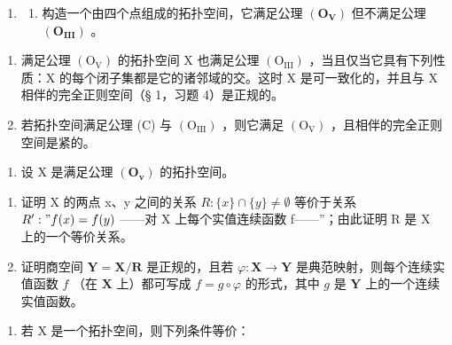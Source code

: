 \ExerciseSection

\begin{enumerate}
\def\labelenumi{\roman{enumi})}
\tightlist
\item
  \begin{enumerate}
  \def\labelenumii{\alph{enumii})}
  \tightlist
  \item
    构造一个由四个点组成的拓扑空间，它满足公理 \((\mathbf{O}_{\mathbf{V}})\) 但不满足公理 \((\mathbf{O}_{\mathbf{III}})\) 。
  \end{enumerate}
\end{enumerate}

\begin{enumerate}
\def\labelenumi{\alph{enumi})}
\setcounter{enumi}{1}
\item
  满足公理 \((\mathrm{O}_{\mathrm{V}})\) 的拓扑空间 X 也满足公理 \((\mathrm{O}_{\mathrm{III}})\) ，当且仅当它具有下列性质：X 的每个闭子集都是它的诸邻域的交。这时 X 是可一致化的，并且与 X 相伴的完全正则空间（§ 1，习题 4）是正规的。
\item
  若拓扑空间满足公理 (C) 与 \((\mathrm{O}_{\mathrm{III}})\) ，则它满足 \((\mathrm{O}_{\mathrm{V}})\) ，且相伴的完全正则空间是紧的。
\end{enumerate}

\begin{enumerate}
\def\labelenumi{\arabic{enumi})}
\setcounter{enumi}{1}
\tightlist
\item
  设 X 是满足公理 \((\mathbf{O}_{\mathbf{v}})\) 的拓扑空间。
\end{enumerate}

\begin{enumerate}
\def\labelenumi{\alph{enumi})}
\item
  证明 X 的两点 x、y 之间的关系 \(R: \{x\} \cap \{y\} \neq \emptyset\) 等价于关系 \(R' : "f(x) = f(y)\) ——对 X 上每个实值连续函数 f——''；由此证明 R 是 X 上的一个等价关系。
\item
  证明商空间 \(\mathbf{Y} = \mathbf{X} / \mathbf{R}\) 是正规的，且若 \(\varphi: \mathbf{X} \to \mathbf{Y}\) 是典范映射，则每个连续实值函数 \(f\) （在 \(\mathbf{X}\) 上）都可写成 \(f = g \circ \varphi\) 的形式，其中 \(g\) 是 \(\mathbf{Y}\) 上的一个连续实值函数。
\end{enumerate}

\begin{enumerate}
\def\labelenumi{\arabic{enumi})}
\setcounter{enumi}{2}
\tightlist
\item
  若 X 是一个拓扑空间，则下列条件等价：
\end{enumerate}

